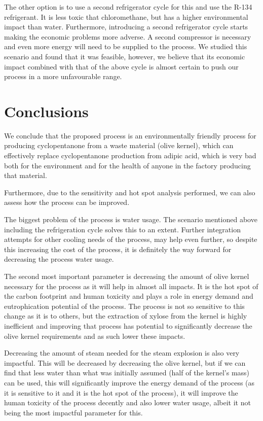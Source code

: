 \documentclass[11pt]{article}
\begin{document}
The other option is to use a second refrigerator cycle for this and use the R-134 refrigerant. It is less toxic that chloromethane, but has a higher environmental impact than water. Furthermore, introducing a second refrigerator cycle starts making the economic problems more adverse. A second compressor is necessary and even more energy will need to be supplied to the process. We studied this scenario and found that it was feasible, however, we believe that its economic impact combined with that of the above cycle is almost certain to push our process in a more unfavourable range.

\section{Conclusions}
\label{sec:orgea3b909}
We conclude that the proposed process is an environmentally friendly process for producing cyclopentanone from a waste material (olive kernel), which can effectively replace cyclopentanone production from adipic acid, which is very bad both for the environment and for the health of anyone in the factory producing that material.

Furthermore, due to the sensitivity and hot spot analysis performed, we can also assess how the process can be improved.

The biggest problem of the process is water usage. The scenario mentioned above including the refrigeration cycle solves this to an extent. Further integration attempts for other cooling needs of the process, may help even further, so despite this increasing the cost of the process, it is definitely the way forward for decreasing the process water usage.

The second most important parameter is decreasing the amount of olive kernel necessary for the process as it will help in almost all impacts. It is the hot spot of the carbon footprint and human toxicity and plays a role in energy demand and eutrophication potential of the process. The process is not so sensitive to this change as it is to others, but the extraction of xylose from the kernel is highly inefficient and improving that process has potential to significantly decrease the olive kernel requirements and as such lower these impacts.

Decreasing the amount of steam needed for the steam explosion is also very impactful. This will be decreased by decreasing the olive kernel, but if we can find that less water than what was initially assumed (half of the kernel's mass) can be used, this will significantly improve the energy demand of the process (as it is sensitive to it and it is the hot spot of the process), it will improve the human toxicity of the process decently and also lower water usage, albeit it not being the most impactful parameter for this.
\end{document}
